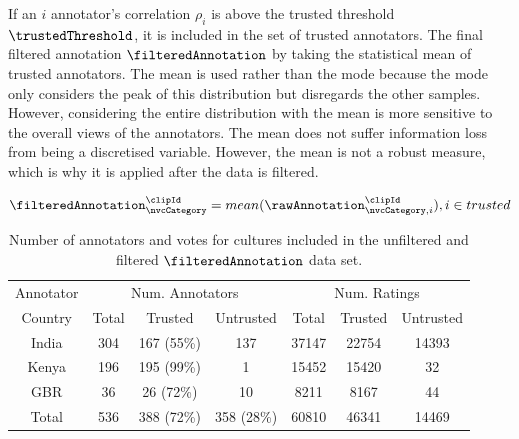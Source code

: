 If an $i$ annotator's correlation $\rho_i$ is above the trusted threshold $\trustedThreshold$, it is included in the set of trusted annotators. The final filtered annotation $\filteredAnnotation$ by taking the statistical mean of trusted annotators.  The mean is used rather than the mode because the mode only considers the peak of this distribution but disregards the other samples. However, considering the entire distribution with the mean is more sensitive to the overall views of the annotators. The mean does not suffer information loss from being a discretised variable. However, the mean is not a robust measure, which is why it is applied after the data is filtered.

\begin{gather}
\filteredAnnotation^{\clipId}_{\nvcCategory} = mean(\rawAnnotation^{\clipId}_{\nvcCategory,i}), i \in trusted
\end{gather}


\begin{table}
\centering
\caption{Number of annotators and votes for cultures included in the unfiltered and filtered $\filteredAnnotation$ data set.}
\begin{tabular}{ | c || c | c  c || c | c  c | }
\hline
Annotator & \multicolumn{3}{c||}{Num. Annotators} & \multicolumn{3}{c|}{Num. Ratings}  \\
Country & Total & Trusted & Untrusted & Total & Trusted & Untrusted \\
\hline
\hline
India & 304 & 167 (55\%) & 137 & 37147 & 22754 & 14393\\
Kenya & 196 & 195 (99\%) & 1   & 15452 & 15420 & 32\\
GBR   & 36  & 26  (72\%) & 10  & 8211  & 8167  & 44\\
\hline
Total & 536 & 388 (72\%) & 358 (28\%) & 60810 & 46341 & 14469\\

\hline
\end{tabular}
\label{NumFilteredWorkersTable}
\end{table}

